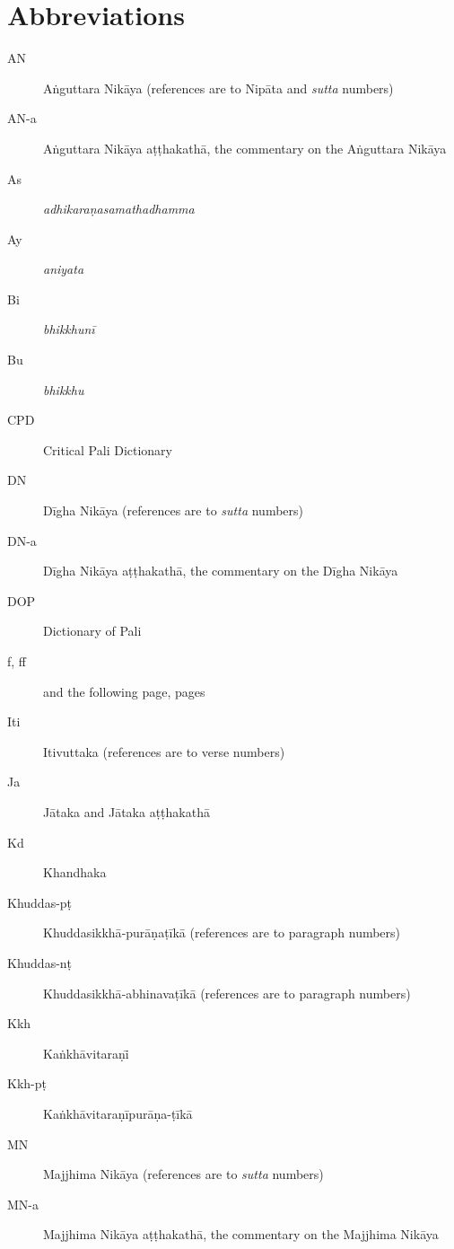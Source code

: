 \documentclass[12pt,openany]{book}%
\begin{document}
%
\chapter*{Abbreviations}

\begin{description}%
\item[AN] \textsanskrit{Aṅguttara} Nikāya (references are to Nipāta and \textit{sutta} numbers)%
\item[AN-a] \textsanskrit{Aṅguttara} Nikāya \textsanskrit{aṭṭhakathā}, the commentary on the \textsanskrit{Aṅguttara} Nikāya%
\item[As] \textit{\textsanskrit{adhikaraṇasamathadhamma}}%
\item[Ay] \textit{aniyata}%
\item[Bi] \textit{\textsanskrit{bhikkhunī}}%
\item[Bu] \textit{bhikkhu}%
\item[CPD] Critical Pali Dictionary%
\item[DN] \textsanskrit{Dīgha} \textsanskrit{Nikāya} (references are to \textit{sutta} numbers)%
\item[DN-a] \textsanskrit{Dīgha} \textsanskrit{Nikāya} \textsanskrit{aṭṭhakathā}, the commentary on the \textsanskrit{Dīgha} \textsanskrit{Nikāya}%
\item[DOP] Dictionary of Pali%
\item[f, ff] and the following page, pages%
\item[Iti] Itivuttaka (references are to verse numbers)%
\item[Ja] \textsanskrit{Jātaka} and \textsanskrit{Jātaka} \textsanskrit{aṭṭhakathā}%
\item[Kd] Khandhaka%
\item[Khuddas-\textsanskrit{pṭ}] \textsanskrit{Khuddasikkhā}-\textsanskrit{purāṇaṭīkā} (references are to paragraph numbers)%
\item[Khuddas-\textsanskrit{nṭ}] \textsanskrit{Khuddasikkhā}-\textsanskrit{abhinavaṭīkā} (references are to paragraph numbers)%
\item[Kkh] \textsanskrit{Kaṅkha}̄\textsanskrit{vitaraṇi}̄%
\item[Kkh-\textsanskrit{pṭ}] \textsanskrit{Kaṅkhāvitaraṇīpurāṇa}-\textsanskrit{ṭīkā}%
\item[MN] Majjhima \textsanskrit{Nikāya} (references are to \textit{sutta} numbers)%
\item[MN-a] Majjhima \textsanskrit{Nikāya} \textsanskrit{aṭṭhakathā}, the commentary on the Majjhima \textsanskrit{Nikāya}%

\end{description}
\end{document}
